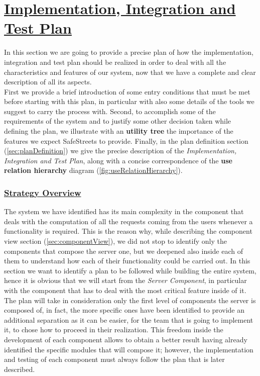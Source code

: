 \section[Implementation, Integration and Test Plan]{\hyperlink{toc}{Implementation, Integration and Test Plan}}
	\label{sec:iitPlan}
	
	In this section we are going to provide a precise plan of how the implementation, integration and test plan should be realized in order to deal with all the characteristics and features of our system, now that we have a complete and clear description of all its aspects.\\
	
	First we provide a brief introduction of some entry conditions that must be met before starting with this plan, in particular with also some details of the tools we suggest to carry the process with. Second, to accomplish some of the requirements of the system and to justify some other decision taken while defining the plan, we illustrate with an \textbf{utility tree} the importance of the features we expect SafeStreets to provide. Finally, in the plan definition section (\ref{sec:planDefinition}) we give the precise description of the \emph{Implementation, Integration and Test Plan}, along with a concise correspondence of the \textbf{use relation hierarchy} diagram (\autoref{fig:useRelationHierarchy}).
	
	\subsubsection[Strategy Overview]{\hyperlink{toc}{Strategy Overview}}
		\label{sec:strategyOverview}
		
		The system we have identified has its main complexity in the component that deals with the computation of all the requests coming from the users whenever a functionality is required. This is the reason why, while describing the component view section (\ref{sec:componentView}), we did not stop to identify only the components that compose the server one, but we deepened also inside each of them to understand how each of their functionality could be carried out. In this section we want to identify a plan to be followed while building the entire system, hence it is obvious that we will start from the \emph{Server Component}, in particular with the component that has to deal with the most critical feature inside of it. The plan will take in consideration only the first level of components the server is composed of, in fact, the more specific ones have been identified to provide an additional separation as it can be easier, for the team that is going to implement it, to chose how to proceed in their realization. This freedom inside the development of each component allows to obtain a better result having already identified the specific modules that will compose it; however, the implementation and testing of each component must always follow the plan that is later described.\\
		
